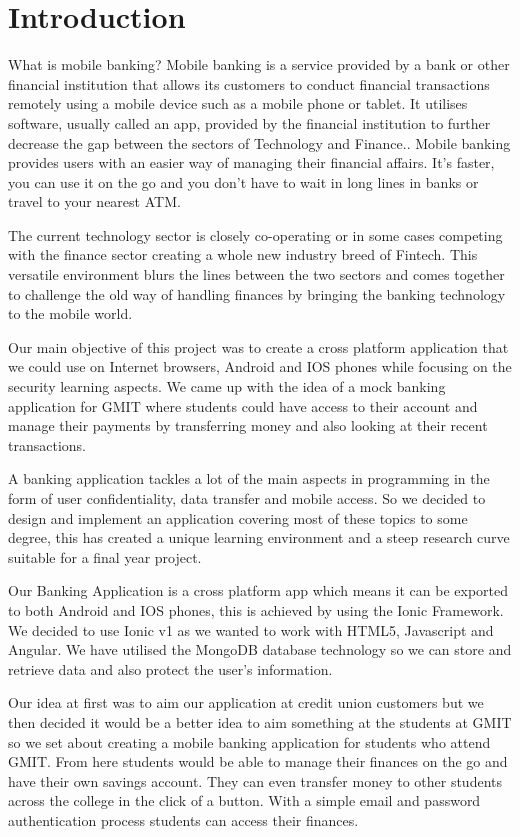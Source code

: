\chapter{Introduction}
What is mobile banking? Mobile banking is a service provided by a bank or other financial institution that allows its customers to conduct financial transactions remotely using a mobile device such as a mobile phone or tablet\cite{mobilebankingwiki}. It utilises software, usually called an app, provided by the financial institution to further decrease the gap between the sectors of Technology and Finance.\cite{mobilebankingwiki}. Mobile banking provides users with an easier way of managing their financial affairs. It's faster, you can use it on the go and you don't have to wait in long lines in banks or travel to your nearest ATM.

The current technology sector is closely co-operating or in some cases competing with the finance sector creating a whole new industry breed of Fintech. This versatile environment blurs the lines between the two sectors and comes together to challenge the old way of handling finances by bringing the banking technology to the mobile world.\cite{fintech}

Our main objective of this project was to create a cross platform application that we could use on Internet browsers, Android and IOS phones while focusing on the security learning aspects. We came up with the idea of a mock banking application for GMIT where students could have access to their account and manage their payments by transferring money and also looking at their recent transactions.

A banking application tackles a lot of the main aspects in programming in the form of user confidentiality, data transfer and mobile access. So we decided to design and implement an application covering most of these topics to some degree, this has created a unique learning environment and a steep research curve suitable for a final year project.

	Our Banking Application is a cross platform app which means it can be exported to both
Android and IOS phones, this is achieved by using the Ionic Framework. We decided to use Ionic v1 as we wanted to work with HTML5, Javascript and Angular. We have utilised the MongoDB database technology so we can store and retrieve data and also protect the user’s information.

Our idea at first was to aim our application at credit union customers but we then decided it would be a better idea to aim something at the students at GMIT so we set about creating a mobile banking application for students who attend GMIT. From here students would be able to manage their finances on the go and have their own savings account. They can even transfer money to other students across the college in the click of a button. With a simple email and password authentication process students can access their finances.

